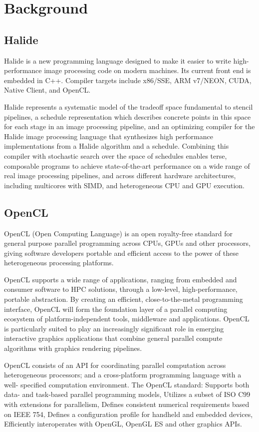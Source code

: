 \chapter{Background}

\section{Halide}
    Halide is a new programming language designed to make it easier to write high-performance image processing code on modern machines. Its current front end is embedded in C++. Compiler targets include x86/SSE, ARM v7/NEON, CUDA, Native Client, and OpenCL.

    Halide represents a systematic model of the tradeoff space fundamental to stencil pipelines, a schedule representation which describes concrete points in this space for each stage in an image processing pipeline, and an optimizing compiler for the Halide image processing language that synthesizes high performance implementations from a Halide algorithm and a schedule. Combining this compiler with stochastic search over the space of schedules enables terse, composable programs to achieve state-of-the-art performance on a wide range of real image processing pipelines, and across different hardware architectures, including multicores with SIMD, and heterogeneous CPU and GPU execution.

\section{OpenCL}
    OpenCL (Open Computing Language) is an open royalty-free standard for general purpose parallel programming across CPUs, GPUs and other processors, giving software developers portable and efficient access to the power of these heterogeneous processing platforms.

    OpenCL supports a wide range of applications, ranging from embedded and consumer software to HPC solutions, through a low-level, high-performance, portable abstraction. By creating an efficient, close-to-the-metal programming interface, OpenCL will form the foundation layer of a parallel computing ecosystem of platform-independent tools, middleware and applications. OpenCL is particularly suited to play an increasingly significant role in emerging interactive graphics applications that combine general parallel compute algorithms with graphics rendering pipelines.
    
    OpenCL consists of an API for coordinating parallel computation across heterogeneous processors; and a cross-platform programming language with a well- specified computation environment. The OpenCL standard: Supports both data- and task-based parallel programming models, Utilizes a subset of ISO C99 with extensions for parallelism, Defines consistent numerical requirements based on IEEE 754, Defines a configuration profile for handheld and embedded devices, Efficiently interoperates with OpenGL, OpenGL ES and other graphics APIs.
